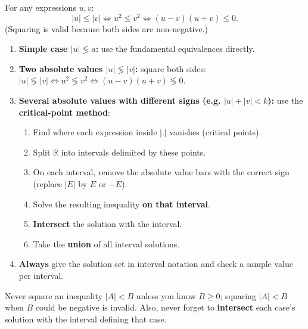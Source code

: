 \documentclass[11pt]{article}
\begin{document}
\begin{propriete}
For any expressions $u, v$:
\[ |u| \leq |v| \iff u^2 \leq v^2 \iff (u-v)(u+v) \leq 0. \]
(Squaring is valid because both sides are non-negative.)
\end{propriete}

\begin{methode}
\begin{enumerate}
\item \textbf{Simple case $|u| \lessgtr a$:} use the fundamental equivalences directly.
\item \textbf{Two absolute values $|u| \lessgtr |v|$:} square both sides: $|u| \lessgtr |v| \iff u^2 \lessgtr v^2 \iff (u-v)(u+v) \lessgtr 0$.
\item \textbf{Several absolute values with different signs (e.g. $|u| + |v| < k$):} use the \textbf{critical-point method}:
\begin{enumerate}
\item Find where each expression inside $|.|$ vanishes (critical points).
\item Split $\mathbb{R}$ into intervals delimited by these points.
\item On each interval, remove the absolute value bars with the correct sign (replace $|E|$ by $E$ or $-E$).
\item Solve the resulting inequality \textbf{on that interval}.
\item \textbf{Intersect} the solution with the interval.
\item Take the \textbf{union} of all interval solutions.
\end{enumerate}
\item \textbf{Always} give the solution set in interval notation and check a sample value per interval.
\end{enumerate}
\end{methode}

\begin{attention}
Never square an inequality $|A| < B$ unless you know $B \geq 0$; squaring $|A| < B$ when $B$ could be negative is invalid. Also, never forget to \textbf{intersect} each case's solution with the interval defining that case.
\end{attention}
\end{document}
